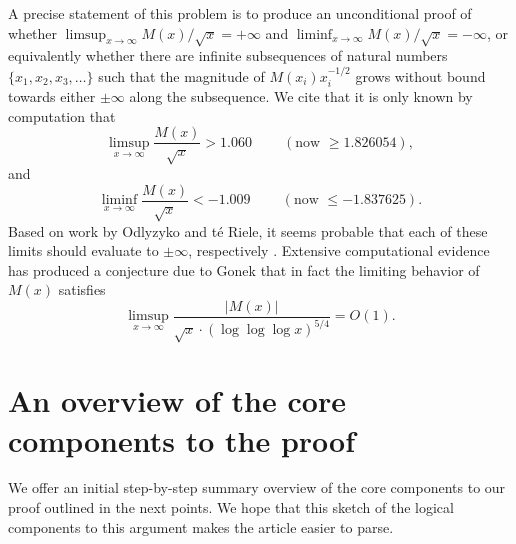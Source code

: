 \documentclass[11pt,reqno,a4letter]{article}
\numberwithin{figure}{section}
\numberwithin{table}{section}
\newcommand{\cf}{\textit{cf.\ }}
\newcommand{\seqnum}[1]{\href{http://oeis.org/#1}{\color{ProcessBlue}{\underline{#1}}}}
\theoremstyle{plain}
\numberwithin{theorem}{section}
\theoremstyle{definition}
\begin{document}
A precise statement of this 
problem is to produce an unconditional proof of whether 
$\limsup_{x \rightarrow \infty} M(x) / \sqrt{x} = +\infty$ and 
$\liminf_{x \rightarrow \infty} M(x) / \sqrt{x} = -\infty$, or 
equivalently whether there are infinite subsequences of natural numbers 
$\{x_1, x_2, x_3, \ldots\}$ such that the magnitude of 
$M(x_i) x_i^{-1/2}$ grows without bound towards either $\pm \infty$ 
along the subsequence. 
We cite that it is only known by computation 
that \cite[\cf \S 4.1]{PRIMEREC} 
\cite[\cf \seqnum{A051400}; \seqnum{A051401}]{OEIS} 
\[
\limsup_{x\rightarrow\infty} \frac{M(x)}{\sqrt{x}} > 1.060\ \qquad (\text{now } \geq 1.826054), 
\] 
and 
\[ 
\liminf_{x\rightarrow\infty} \frac{M(x)}{\sqrt{x}} < -1.009\ \qquad (\text{now } \leq -1.837625). 
\] 
Based on work by Odlyzyko and t\'{e} Riele, it seems probable that 
each of these limits should evaluate to $\pm \infty$, respectively 
\cite{ODLYZ-TRIELE,MREVISITED,ORDER-MERTENSFN,HURST-2017}. 
Extensive computational evidence has produced 
a conjecture due to Gonek that in fact the limiting behavior of 
$M(x)$ satisfies \cite{NG-MERTENS}
$$\limsup_{x \rightarrow \infty} \frac{|M(x)|}{\sqrt{x} \cdot (\log\log\log x)^{5/4}} = O(1).$$ 

\newpage
\section{An overview of the core components to the proof} 

We offer an initial step-by-step summary overview of the core components 
to our proof outlined in the next points. 
We hope that this sketch of the logical components 
to this argument makes the article easier to parse. 
\end{document}
